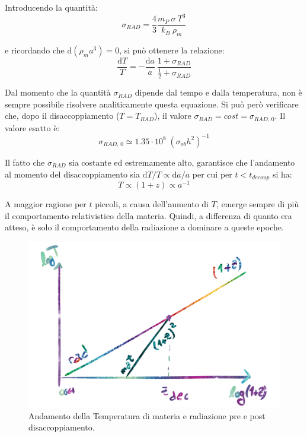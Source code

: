 Introducendo la quantità:
\begin{equation}
    \sigma_{RAD}= \frac{4}{3} \frac{m_P ~\sigma ~T^3}{k_B ~\rho_m}
\end{equation}

e ricordando che $\mathrm{d} (\rho_m a^3) = 0$, si può ottenere la relazione:
\begin{equation}
\frac{ \mathrm{d}T}{T}= - \frac{ \mathrm{d}a}{a} \: \frac{1+\sigma_{RAD}}{\frac{1}{2} +\sigma_{RAD}}
\end{equation}

Dal momento che la quantità $\sigma_{RAD}$ dipende dal tempo e dalla temperatura, non è sempre possibile risolvere analiticamente questa equazione. Si può però verificare che, dopo il disaccoppiamento ($T=T_{RAD}$), il valore $\sigma_{RAD}=cost=\sigma_{RAD, \, 0}$. Il valore esatto è:
\begin{equation*}
    \sigma_{RAD, \, 0} \simeq 1.35 \cdot 10^8 \; (\sigma_{ob}h^2)^{-1}
\end{equation*}

Il fatto che $\sigma_{RAD}$ sia costante ed estremamente alto, garantisce che l'andamento al momento del disaccoppiamento sia $\mathrm{d}T / T \propto \mathrm{d}a / a$ per cui per $t<t_{decoup}$ si ha: 
\begin{equation}
T \propto (1+z) \propto a^{-1} 
\end{equation}

A maggior ragione per $t$ piccoli, a causa dell'aumento di $T$, emerge sempre di più il comportamento relativistico della materia. Quindi, a differenza di quanto era atteso, è solo il comportamento della radiazione a dominare a queste epoche.

\begin{figure}[h]
    \centering
    \includegraphics[width=.8\textwidth]{Pictures/3/logT-z.png}
    \caption{Andamento della Temperatura di materia e radiazione pre e post disaccoppiamento.}
    \label{fig:3logzt}
\end{figure}

